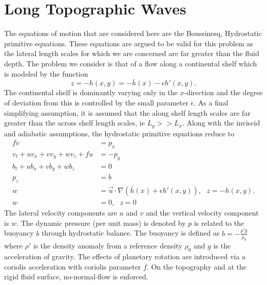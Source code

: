 \documentclass[12pt]{workjournal}
\begin{document}
\section{Long Topographic Waves}
The equations of motion that are considered here are the Boussinesq, Hydrostatic primitive equations. These equations are argued to be valid for this problem as the lateral length scales for which we are concerned are far greater than the fluid depth. The problem we consider is that of a flow along a continental shelf which is modeled by the function
\begin{equation}
z=-h(x,y) = -\bar{h}(x) - \epsilon h'(x,y). \label{eq:generalBathy}
\end{equation} 
 The continental shelf is dominantly varying only in the $x$-direction and the degree of deviation from this is controlled by the small parameter $\epsilon$. As a final simplifying assumption, it is assumed that the along shelf length scales are far greater than the across shelf length scales, ie $L_y >> L_x$.   Along with the inviscid and adiabatic assumptions, the hydrostatic primitive equations reduce to 
  \begin{subequations}
  \begin{align}
  fv &= p_x \\
  v_t + uv_x + vv_y + wv_z + fu &= -p_y \\
  b_t + ub_x + v b_y + w b_z &= 0 \\
  p_z &= b \\
  w &= \vec{u} \cdot \nabla(\bar{h}(x) + \epsilon h'(x,y)), \text{ $z = -h(x,y)$}. \\
  w &= 0, \text{ $z =0$}
  \end{align} \label{eq:LongWaveEquations}
  \end{subequations}
The lateral velocity components are $u$ and $v$ and the vertical velocity component is $w$. The dynamic pressure (per unit mass) is denoted by $p$ is related to the buoyancy $b$ through hydrostatic balance. The buoyancy is defined as $b = -\frac{\rho' g}{\rho_0}$ where $\rho'$ is the density anomaly from a reference density $\rho_0$ and $g$ is the acceleration of gravity. The effects of planetary rotation are introduced via a coriolis acceleration with coriolis parameter $f$. On the topography and at the rigid fluid surface, no-normal-flow is enforced.
\end{document}
